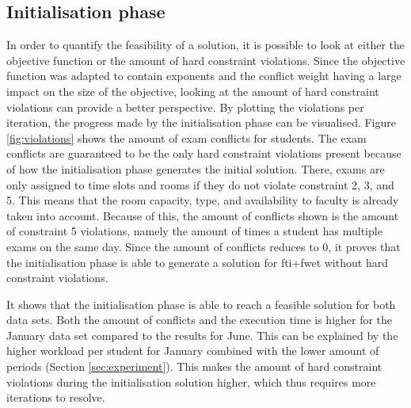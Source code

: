 \subsection{Initialisation phase} \label{phase_init}

In order to quantify the feasibility of a solution, it is possible to look at either the objective function or the amount of hard constraint violations. Since the objective function was adapted to contain exponents and the conflict weight having a large impact on the size of the objective, looking at the amount of hard constraint violations can provide a better perspective. By plotting the violations per iteration, the progress made by the initialisation phase can be visualised. Figure \ref{fig:violations} shows the amount of exam conflicts for students. The exam conflicts are guaranteed to be the only hard constraint violations present because of how the initialisation phase generates the initial solution. There, exams are only assigned to time slots and rooms if they do not violate constraint 2, 3, and 5. This means that the room capacity, type, and availability to faculty is already taken into account. Because of this, the amount of conflicts shown is the amount of constraint 5 violations, namely the amount of times a student has multiple exams on the same day. Since the amount of conflicts reduces to 0, it proves that the initialisation phase is able to generate a solution for \acrshort{fti}+\acrshort{fwet} without hard constraint violations. 

It shows that the initialisation phase is able to reach a feasible solution for both data sets. Both the amount of conflicts and the execution time is higher for the January data set compared to the results for June. This can be explained by the higher workload per student for January combined with the lower amount of periods (Section \ref{sec:experiment}). This makes the amount of hard constraint violations during the initialisation solution higher, which thus requires more iterations to resolve.

